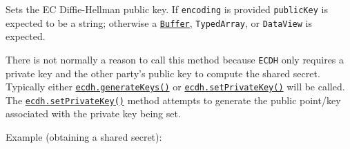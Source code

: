 Sets the EC Diffie-Hellman public key. If \texttt{encoding} is provided
\texttt{publicKey} is expected to be a string; otherwise a
\href{buffer.md}{\texttt{Buffer}}, \texttt{TypedArray}, or
\texttt{DataView} is expected.

There is not normally a reason to call this method because \texttt{ECDH}
only requires a private key and the other party's public key to compute
the shared secret. Typically either
\hyperref[ecdhgeneratekeysencoding-format]{\texttt{ecdh.generateKeys()}}
or
\hyperref[ecdhsetprivatekeyprivatekey-encoding]{\texttt{ecdh.setPrivateKey()}}
will be called. The
\hyperref[ecdhsetprivatekeyprivatekey-encoding]{\texttt{ecdh.setPrivateKey()}}
method attempts to generate the public point/key associated with the
private key being set.

Example (obtaining a shared secret):

